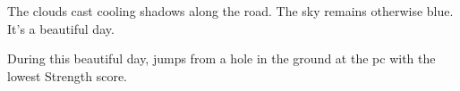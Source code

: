 \begin{boxtext}
	The clouds cast cooling shadows along the road.
	The sky remains otherwise blue.
	It's a beautiful day.
\end{boxtext}

During this beautiful day,  jumps from a hole in the ground at the \gls{pc} with the lowest Strength score.

\mouthdigger
